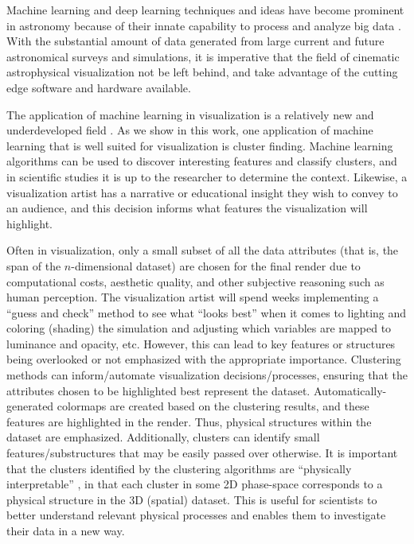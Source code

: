 \documentclass[fleqn,usenatbib,useAMS]{mnras}
\begin{document}
Machine learning and deep learning techniques and ideas have become prominent in astronomy because of their innate capability to process and analyze big data \citep[\& references therein]{Bell10, Pesenson10, Burke19, Baron19}. With the substantial amount of data generated from large current and future astronomical surveys and simulations, it is imperative that the field of cinematic astrophysical visualization not be left behind, and take advantage of the cutting edge software and hardware available. \par
 
The application of machine learning in visualization is a relatively new and underdeveloped field \citep{Ma07}. As we show in this work, one application of machine learning that is well suited for visualization is cluster finding. Machine learning algorithms can be used to discover interesting features and classify clusters, and in scientific studies it is up to the researcher to determine the context. Likewise, a visualization artist has a narrative or educational insight they wish to convey to an audience, and this decision informs what features the visualization will highlight. \par 

Often in visualization, only a small subset of all the data attributes (that is, the span of the $n$-dimensional dataset) are chosen for the final render due to computational costs, aesthetic quality, and other subjective reasoning such as human perception. The visualization artist will spend weeks implementing a ``guess and check'' method to see what ``looks best'' when it comes to lighting and coloring (shading) the simulation and adjusting which variables are mapped to luminance and opacity, etc. However, this can lead to key features or structures being overlooked or not emphasized with the appropriate importance. Clustering methods can inform/automate visualization decisions/processes, ensuring that the attributes chosen to be highlighted best represent the dataset. Automatically-generated colormaps are created based on the clustering results, and these features are highlighted in the render. Thus, physical structures within the dataset are emphasized. Additionally, clusters can identify small features/substructures that may be easily passed over otherwise. It is important that the clusters identified by the clustering algorithms are ``physically interpretable'' \citep{Milosavljevic18}, in that each cluster in some 2D phase-space corresponds to a physical structure in the 3D (spatial) dataset. This is useful for scientists to better understand relevant physical processes and enables them to investigate their data in a new way. \par
 
\end{document}
